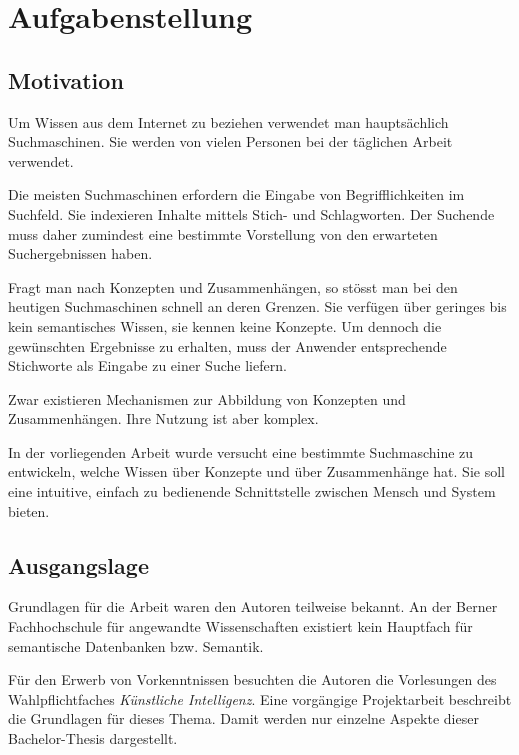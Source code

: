 \chapter{Aufgabenstellung}
\label{chap:Aufgabenstellung}


\section{Motivation}
\label{sec:aufgabe_motivation}
Um Wissen aus dem Internet zu beziehen verwendet man hauptsächlich Suchmaschinen. Sie werden von vielen Personen bei der täglichen Arbeit verwendet.

Die meisten Suchmaschinen erfordern die Eingabe von Begrifflichkeiten im Suchfeld. Sie indexieren Inhalte mittels Stich- und Schlagworten. Der Suchende muss daher zumindest eine bestimmte Vorstellung von den erwarteten Suchergebnissen haben.

Fragt man nach Konzepten und Zusammenhängen, so stösst man bei den heutigen Suchmaschinen schnell an deren Grenzen. Sie verfügen über geringes bis kein semantisches Wissen, sie kennen keine Konzepte. Um dennoch die gewünschten Ergebnisse zu erhalten, muss der Anwender entsprechende Stichworte als Eingabe zu einer Suche liefern.

Zwar existieren Mechanismen zur Abbildung von Konzepten und Zusammenhängen. Ihre Nutzung ist aber komplex.

In der vorliegenden Arbeit wurde versucht eine bestimmte Suchmaschine zu entwickeln, welche Wissen über Konzepte und über Zusammenhänge hat. Sie soll eine intuitive, einfach zu bedienende Schnittstelle zwischen Mensch und System bieten.

\section{Ausgangslage}
\label{sec:aufgabe_ausgangslage}
Grundlagen für die Arbeit waren den Autoren teilweise bekannt. An der Berner Fachhochschule für angewandte Wissenschaften existiert kein Hauptfach für semantische Datenbanken bzw. Semantik.

Für den Erwerb von Vorkenntnissen besuchten die Autoren die Vorlesungen des Wahlpflichtfaches \textit{Künstliche Intelligenz}. Eine vorgängige Projektarbeit beschreibt die Grundlagen für dieses Thema. Damit werden nur einzelne Aspekte dieser Bachelor-Thesis dargestellt.

